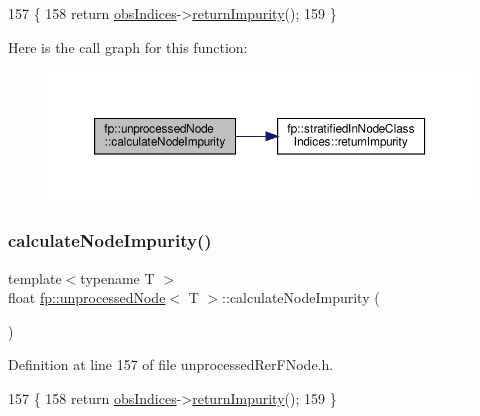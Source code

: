\begin{DoxyCode}
157                                                     \{
158                     \textcolor{keywordflow}{return} \hyperlink{classfp_1_1unprocessedNode_aba9f03124658f62906fa8ded53cef535}{obsIndices}->\hyperlink{classfp_1_1stratifiedInNodeClassIndices_a044392c507fe54073f55f5ae6aceac5f}{returnImpurity}();
159                 \}
\end{DoxyCode}
Here is the call graph for this function\+:
\nopagebreak
\begin{figure}[H]
\begin{center}
\leavevmode
\includegraphics[width=350pt]{classfp_1_1unprocessedNode_a0278b4dd8d905d38d75ced9a95839a12_cgraph}
\end{center}
\end{figure}
\mbox{\label{classfp_1_1unprocessedNode_a0278b4dd8d905d38d75ced9a95839a12}} 
\subsubsection{\texorpdfstring{calculate\+Node\+Impurity()}{calculateNodeImpurity()}\hspace{0.1cm}{\footnotesize\ttfamily [2/2]}}
{\footnotesize\ttfamily template$<$typename T $>$ \\
float \hyperlink{classfp_1_1unprocessedNode}{fp\+::unprocessed\+Node}$<$ T $>$\+::calculate\+Node\+Impurity (\begin{DoxyParamCaption}{ }\end{DoxyParamCaption})\hspace{0.3cm}{\ttfamily [inline]}}



Definition at line 157 of file unprocessed\+Rer\+F\+Node.\+h.


\begin{DoxyCode}
157                                                     \{
158                     \textcolor{keywordflow}{return} \hyperlink{classfp_1_1unprocessedNode_aba9f03124658f62906fa8ded53cef535}{obsIndices}->\hyperlink{classfp_1_1stratifiedInNodeClassIndices_a044392c507fe54073f55f5ae6aceac5f}{returnImpurity}();
159                 \}
\end{DoxyCode}
\mbox{\label{classfp_1_1unprocessedNode_a5fea1583d2250e14470d92568b57e60c}} 
